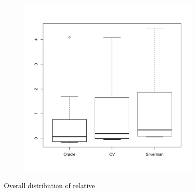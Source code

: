 \begin{figure}[htbp]
\begin{subfigure}[t]{0.45\textwidth}
        \includegraphics[width=\textwidth]{results/by_overall/relative-peak-bias-peakpop-boxplot}
        \label{fig:discussion:overall_peakbias_boxplot:peak}
    \end{subfigure}
    \caption{Overall distribution of relative }
    \label{fig:discussion:overall_peakbias_boxplot}
\end{figure}

